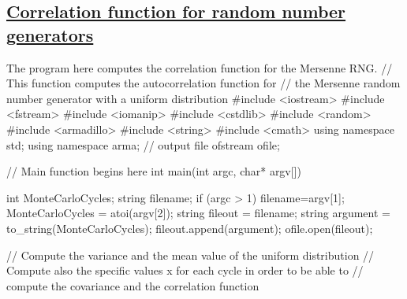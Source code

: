 \documentclass[%
oneside,                 %
final,                   %
10pt]{article}
\newenvironment{block_mdfboxadmon}[1][]{
\begin{block_mdfboxmdframed}[frametitle=#1]
}
{
\end{block_mdfboxmdframed}
}
\begin{document}
\subsection{\href{{https://github.com/CompPhysics/ComputationalPhysicsMSU/blob/master/doc/Programs/LecturePrograms/programs/MCIntro/cpp/program6.cpp}}{Correlation function for random number generators}}

\begin{block_mdfboxadmon}[]
The program here computes the correlation function for the Mersenne RNG. 
\bcppcod
//  This function computes the autocorrelation function for 
//  the Mersenne random number generator with a uniform distribution
#include <iostream>
#include <fstream>
#include <iomanip>
#include <cstdlib>
#include <random>
#include <armadillo>
#include <string>
#include <cmath>
using namespace  std;
using namespace arma;
// output file
ofstream ofile;

//     Main function begins here     
int main(int argc, char* argv[])
{
  int MonteCarloCycles;
  string filename;
  if (argc > 1) {
    filename=argv[1];
    MonteCarloCycles = atoi(argv[2]);
    string fileout = filename;
    string argument = to_string(MonteCarloCycles);
    fileout.append(argument);
    ofile.open(fileout);
  }

  // Compute the variance and the mean value of the uniform distribution
  // Compute also the specific values x for each cycle in order to be able to
  // compute the covariance and the correlation function  

}
\end{block_mdfboxadmon}
\end{document}
